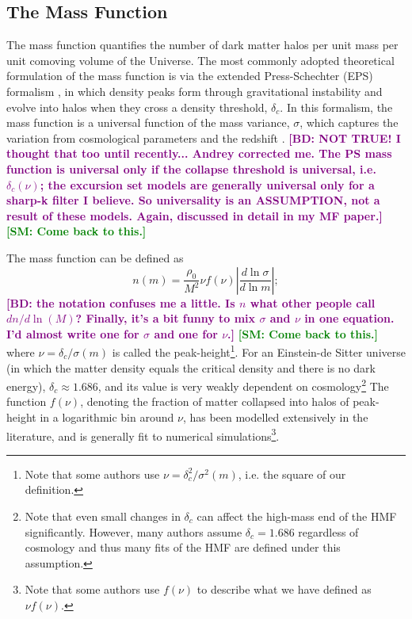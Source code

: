 \documentclass[5p]{elsarticle}
\newcommand{\bd}[1]{\textcolor{purple}{\textbf{[BD: #1]}}}
\newcommand{\sgm}[1]{\textcolor{green}{\textbf{[SM: #1]}}}
\begin{document}
\subsection{The Mass Function}
\label{sec:massfunction}
The mass function quantifies the number of dark matter halos per unit
mass per unit comoving volume of the Universe. 
The most commonly adopted theoretical formulation of the mass function is via the extended Press-Schechter (EPS) formalism \citep{Press1974,Bond1991}, in which density peaks form through gravitational instability and evolve into halos when they cross a density threshold, $\delta_c$. 
In this formalism, the mass function is a universal function of the mass variance, $\sigma$, which captures the variation from cosmological parameters and the redshift \citep[but note that several recent studies find significant non-universality with redshift, and have provided fits that explicitly account for this departure]{Jenkins2001}. \bd{NOT TRUE! I thought that too until recently... Andrey corrected me. The PS mass function is universal only if the collapse threshold is universal, i.e. $\delta_c(\nu)$; the excursion set models are generally universal only for a sharp-k filter I believe. So universality is an ASSUMPTION, not a result of these models. Again, discussed in detail in my MF paper.} 
\sgm{Come back to this.}

The mass function can be defined as
\begin{equation}
\label{eq:hmf}
  n(m) = \frac{\rho_0}{M^2} \nu f(\nu) \left|\frac{d\ln\sigma}{d\ln m}\right|;
\end{equation}
\bd{the notation confuses me a little. Is $n$ what other people call $dn/d\ln(M)$?  Finally, it's a bit funny to mix $\sigma$ and $\nu$ in one equation. I'd almost write one for $\sigma$ and one for $\nu$.}
\sgm{Come back to this.}
where $\nu = \delta_c/\sigma(m)$ is called the peak-height\footnote{Note that some authors use $\nu = \delta^2_c/\sigma^2(m)$, i.e. the square of our definition.}.
For an Einstein-de Sitter universe (in which the matter density equals the critical density and there is no dark energy), $\delta_c \approx 1.686$, and its value is very weakly dependent on cosmology\footnote{Note that even small changes in $\delta_c$ can affect the high-mass end of the HMF significantly. However, many authors assume $\delta_c = 1.686$ regardless of cosmology and thus many fits of the HMF are defined under this assumption.}
The function $f(\nu)$, denoting the fraction of matter collapsed into halos of peak-height in a logarithmic bin around $\nu$, has been modelled extensively in the literature, and is generally fit to numerical simulations\footnote{Note that some authors use $f(\nu)$ to describe what we have defined as $\nu f(\nu)$.}. 
\end{document}
